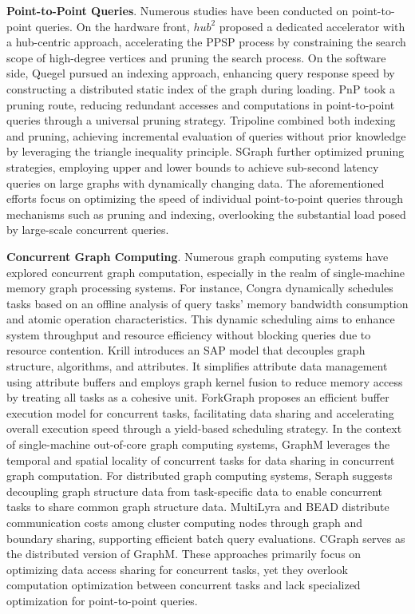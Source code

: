 \documentclass[lettersize,journal]{IEEEtran} %
\begin{document}
{\bf{Point-to-Point Queries}}. Numerous studies have been conducted on point-to-point queries. On the hardware front, $hub^2$\cite{hub} proposed a dedicated accelerator with a hub-centric approach, accelerating the PPSP process by constraining the search scope of high-degree vertices and pruning the search process. On the software side, Quegel\cite{quegel} pursued an indexing approach, enhancing query response speed by constructing a distributed static index of the graph during loading. PnP\cite{pnp} took a pruning route, reducing redundant accesses and computations in point-to-point queries through a universal pruning strategy. Tripoline\cite{tripoline} combined both indexing and pruning, achieving incremental evaluation of queries without prior knowledge by leveraging the triangle inequality principle. SGraph\cite{sgraph} further optimized pruning strategies, employing upper and lower bounds to achieve sub-second latency queries on large graphs with dynamically changing data. The aforementioned efforts focus on optimizing the speed of individual point-to-point queries through mechanisms such as pruning and indexing, overlooking the substantial load posed by large-scale concurrent queries.

{\bf{Concurrent Graph Computing}}. Numerous graph computing systems have explored concurrent graph computation, especially in the realm of single-machine memory graph processing systems. For instance, Congra\cite{Congra} dynamically schedules tasks based on an offline analysis of query tasks' memory bandwidth consumption and atomic operation characteristics. This dynamic scheduling aims to enhance system throughput and resource efficiency without blocking queries due to resource contention. Krill\cite{krill} introduces an SAP model that decouples graph structure, algorithms, and attributes. It simplifies attribute data management using attribute buffers and employs graph kernel fusion to reduce memory access by treating all tasks as a cohesive unit. ForkGraph\cite{cache} proposes an efficient buffer execution model for concurrent tasks, facilitating data sharing and accelerating overall execution speed through a yield-based scheduling strategy. In the context of single-machine out-of-core graph computing systems, GraphM\cite{graphm} leverages the temporal and spatial locality of concurrent tasks for data sharing in concurrent graph computation. For distributed graph computing systems, Seraph\cite{seraph} suggests decoupling graph structure data from task-specific data to enable concurrent tasks to share common graph structure data. MultiLyra\cite{multilyra} and BEAD\cite{bead} distribute communication costs among cluster computing nodes through graph and boundary sharing, supporting efficient batch query evaluations. CGraph\cite{cgraph} serves as the distributed version of GraphM\cite{graphm}. These approaches primarily focus on optimizing data access sharing for concurrent tasks, yet they overlook computation optimization between concurrent tasks and lack specialized optimization for point-to-point queries.
\end{document}

